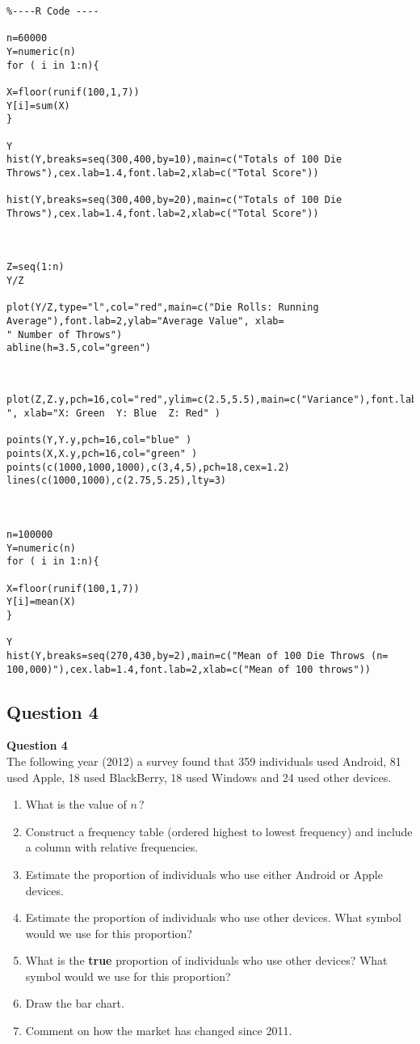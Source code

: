 \documentclass[]{report}
\begin{document}
\newpage
\begin{verbatim}
%----R Code ----

n=60000
Y=numeric(n)
for ( i in 1:n){

X=floor(runif(100,1,7))
Y[i]=sum(X)
}

Y
hist(Y,breaks=seq(300,400,by=10),main=c("Totals of 100 Die Throws"),cex.lab=1.4,font.lab=2,xlab=c("Total Score"))

hist(Y,breaks=seq(300,400,by=20),main=c("Totals of 100 Die Throws"),cex.lab=1.4,font.lab=2,xlab=c("Total Score"))



Z=seq(1:n)
Y/Z

plot(Y/Z,type="l",col="red",main=c("Die Rolls: Running Average"),font.lab=2,ylab="Average Value", xlab=
" Number of Throws")
abline(h=3.5,col="green")


\end{verbatim}
\begin{verbatim}

plot(Z,Z.y,pch=16,col="red",ylim=c(2.5,5.5),main=c("Variance"),font.lab=2,ylab=" ", xlab="X: Green  Y: Blue  Z: Red" )

points(Y,Y.y,pch=16,col="blue" )
points(X,X.y,pch=16,col="green" )
points(c(1000,1000,1000),c(3,4,5),pch=18,cex=1.2)
lines(c(1000,1000),c(2.75,5.25),lty=3)



n=100000
Y=numeric(n)
for ( i in 1:n){

X=floor(runif(100,1,7))
Y[i]=mean(X)
}

Y
hist(Y,breaks=seq(270,430,by=2),main=c("Mean of 100 Die Throws (n= 100,000)"),cex.lab=1.4,font.lab=2,xlab=c("Mean of 100 throws")) 
\end{verbatim}

\subsection{Question 4}
{ \textbf{Question 4}\\[-0.8cm]}
The following year (2012) a survey found that 359 individuals used Android, 81 used Apple, 18 used BlackBerry, 18 used Windows and 24 used other devices.\\[0.2cm]
\begin{enumerate}
\item What is the value of $n$\,?
\item Construct a frequency table (ordered highest to lowest frequency) and include a column with relative frequencies.
\item Estimate the proportion of individuals who use either Android or Apple devices.

\item Estimate the proportion of individuals who use other devices. What symbol would we use for this proportion?
\item What is the \textbf{true} proportion of individuals who use other devices? What symbol would we use for this proportion?
\item Draw the bar chart.
\item Comment on how the market has changed since 2011.
\end{enumerate}


\newpage
\end{document}
